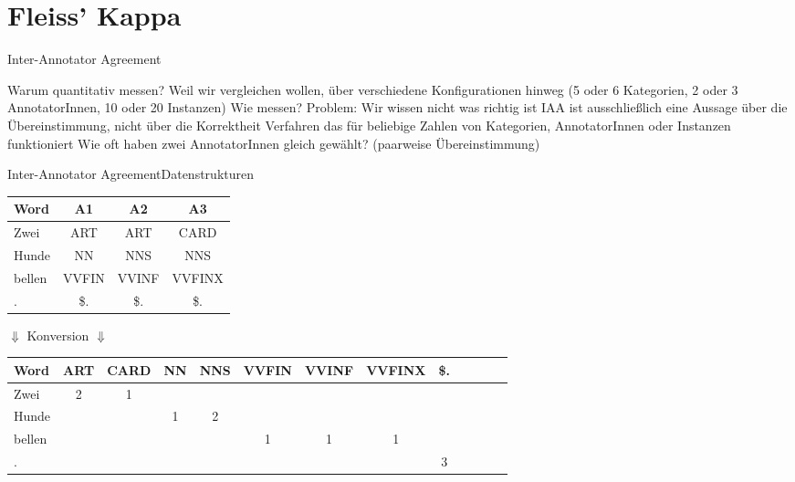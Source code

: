 \documentclass[aspectratio=169]{beamer}
\begin{document}
\appendix

\section{Fleiss' Kappa}

\frame{\sectionpage}

\begin{frame}{Inter-Annotator Agreement}
\begin{outline}
\1 Warum quantitativ messen?
\2 Weil wir vergleichen wollen, über verschiedene Konfigurationen hinweg
\3 (5 oder 6 Kategorien, 2 oder 3 AnnotatorInnen, 10 oder 20 Instanzen)
\pause
\1 Wie messen?
\2 Problem: Wir wissen nicht was richtig ist
\3 IAA ist ausschließlich eine Aussage über die Übereinstimmung, nicht über die Korrektheit
\pause
\2 Verfahren das für beliebige Zahlen von Kategorien, AnnotatorInnen oder Instanzen funktioniert
\2 Wie oft haben zwei AnnotatorInnen gleich gewählt? (paarweise Übereinstimmung)
\end{outline}
\end{frame}

\begin{frame}[fragile]{Inter-Annotator Agreement}{Datenstrukturen}

\centering

\begin{tabular}{lccc}
\toprule
Word & A1 & A2 & A3 \\
\midrule
Zwei & ART & ART & CARD \\
Hunde & NN & NNS & NNS \\
bellen & VVFIN & VVINF & VVFINX \\
. & \$. & \$. & \$. \\
\bottomrule
\end{tabular}

\pause
\vspace{1em}
$\Downarrow$ Konversion $\Downarrow$
\vspace{1em}

\begin{tabular}{lcccccccccccc}
\toprule
Word & ART & CARD & NN & NNS & VVFIN & VVINF & VVFINX & \$. \\
\midrule
Zwei & 2 & 1 \\
Hunde & & & 1 & 2 \\
bellen & & & & & 1 & 1 & 1 \\
. & & & & & & & & 3 \\
\bottomrule
\end{tabular}

\end{frame}
\end{document}
